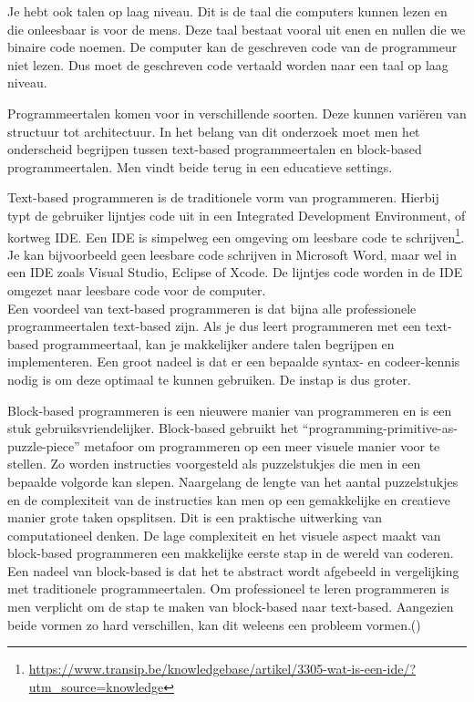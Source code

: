  Je hebt ook talen op laag niveau. Dit is de taal die computers kunnen lezen en die onleesbaar is voor de mens. Deze taal bestaat vooral uit enen en nullen die we binaire code noemen. De computer kan de geschreven code van de programmeur niet lezen. Dus moet de geschreven code vertaald worden naar een taal op laag niveau.

Programmeertalen komen voor in verschillende soorten. Deze kunnen variëren van structuur tot architectuur. In het belang van dit onderzoek moet men het onderscheid begrijpen tussen text-based programmeertalen en block-based programmeertalen. Men vindt beide terug in een educatieve settings.

Text-based programmeren is de traditionele vorm van programmeren. Hierbij typt de gebruiker lijntjes code uit in een Integrated Development Environment, of kortweg IDE. Een IDE is simpelweg een omgeving om leesbare code te schrijven\footnote{\url{https://www.transip.be/knowledgebase/artikel/3305-wat-is-een-ide/?utm_source=knowledge}}. Je kan bijvoorbeeld geen leesbare code schrijven in Microsoft Word, maar wel in een IDE zoals Visual Studio, Eclipse of Xcode. De lijntjes code worden in de IDE omgezet naar leesbare code voor de computer.\\

Een voordeel van text-based programmeren is dat bijna alle professionele programmeertalen text-based zijn. Als je dus leert programmeren met een text-based programmeertaal, kan je makkelijker andere talen begrijpen en implementeren. Een groot nadeel is dat er een bepaalde syntax- en codeer-kennis nodig is om deze optimaal te kunnen gebruiken. De instap is dus groter. 

Block-based programmeren is een nieuwere manier van programmeren en is een stuk gebruiksvriendelijker. Block-based gebruikt het “programming-primitive-as-puzzle-piece” metafoor om programmeren op een meer visuele manier voor te stellen. Zo worden instructies voorgesteld als puzzelstukjes die men in een bepaalde volgorde kan slepen. Naargelang de lengte van het aantal puzzelstukjes en de complexiteit van de instructies kan men op een gemakkelijke en creatieve manier grote taken opsplitsen. Dit is een praktische uitwerking van computationeel denken. De lage complexiteit en het visuele aspect maakt van block-based programmeren een makkelijke eerste stap in de wereld van coderen. \\

Een nadeel van block-based is dat het te abstract wordt afgebeeld in vergelijking met traditionele programmeertalen. Om professioneel te leren programmeren is men verplicht om de stap te maken van block-based naar text-based. Aangezien beide vormen zo hard verschillen, kan dit weleens een probleem vormen.(\cite{Weintrop2019,Maloney2010})

